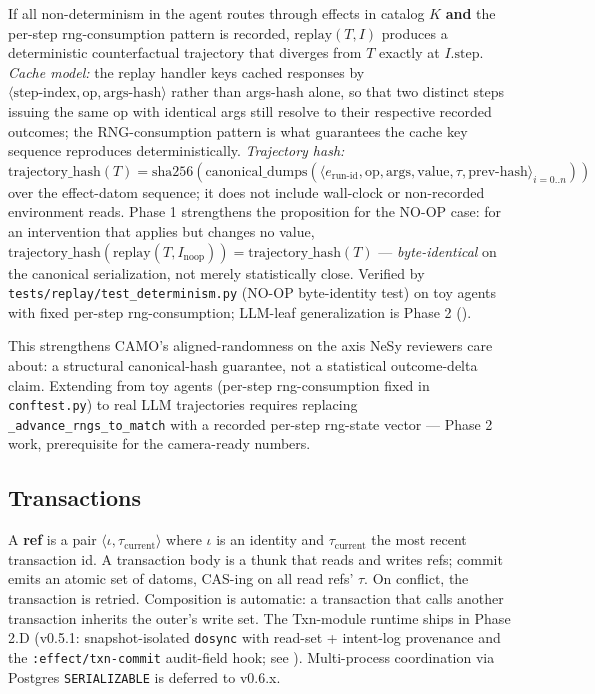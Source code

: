 \documentclass[anon]{nesy2026}   %
\newcommand{\C}[1]{\texttt{#1}}
\begin{document}
\begin{proposition}\label{prop:noop}
If all non-determinism in the agent routes through effects in catalog $K$ \textbf{and} the per-step rng-consumption pattern is recorded, $\text{replay}(T, I)$ produces a deterministic counterfactual trajectory that diverges from $T$ exactly at $I.\text{step}$. \emph{Cache model:} the replay handler keys cached responses by $\langle \text{step-index}, \text{op}, \text{args-hash} \rangle$ rather than args-hash alone, so that two distinct steps issuing the same op with identical args still resolve to their respective recorded outcomes; the RNG-consumption pattern is what guarantees the cache key sequence reproduces deterministically. \emph{Trajectory hash:} $\text{trajectory\_hash}(T) = \text{sha256}(\text{canonical\_dumps}(\langle e_{\text{run-id}}, \text{op}, \text{args}, \text{value}, \tau, \text{prev-hash} \rangle_{i=0..n}))$ over the effect-datom sequence; it does not include wall-clock or non-recorded environment reads. Phase 1 strengthens the proposition for the NO-OP case: for an intervention that applies but changes no value, $\text{trajectory\_hash}(\text{replay}(T, I_{\text{noop}})) = \text{trajectory\_hash}(T)$ --- \emph{byte-identical} on the canonical serialization, not merely statistically close. Verified by \C{tests/replay/test\_determinism.py} (NO-OP byte-identity test) on toy agents with fixed per-step rng-consumption; LLM-leaf generalization is Phase 2 ().
\end{proposition}

This strengthens CAMO's aligned-randomness on the axis NeSy reviewers care about: a structural canonical-hash guarantee, not a statistical outcome-delta claim. Extending from toy agents (per-step rng-consumption fixed in \C{conftest.py}) to real LLM trajectories requires replacing \C{\_advance\_rngs\_to\_match} with a recorded per-step rng-state vector --- Phase 2 work, prerequisite for the  camera-ready numbers.

\subsection{Transactions}\label{sec:transactions}

A \textbf{ref} is a pair $\langle \iota, \tau_{\text{current}} \rangle$ where $\iota$ is an identity and $\tau_{\text{current}}$ the most recent transaction id. A transaction body is a thunk that reads and writes refs; commit emits an atomic set of datoms, CAS-ing on all read refs' $\tau$. On conflict, the transaction is retried. Composition is automatic: a transaction that calls another transaction inherits the outer's write set. The Txn-module runtime ships in Phase 2.D (v0.5.1: snapshot-isolated \C{dosync} with read-set + intent-log provenance and the \C{:effect/txn-commit} audit-field hook; see ). Multi-process coordination via Postgres \texttt{SERIALIZABLE} is deferred to v0.6.x.
\end{document}
